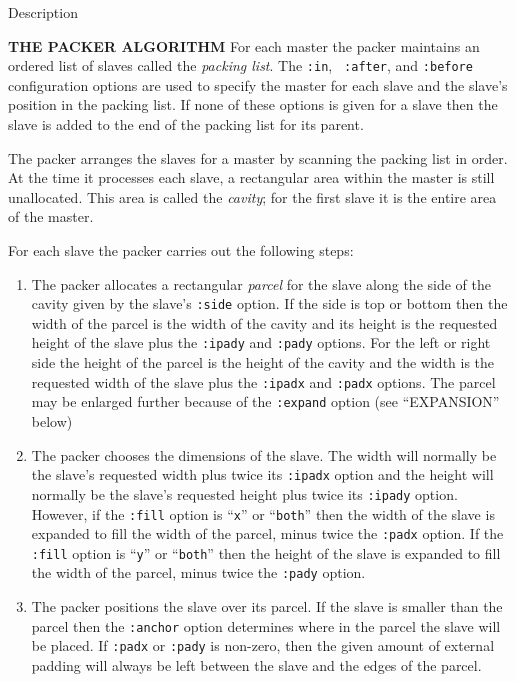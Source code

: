 \begin{schemedoc}{Description}

{\bf THE PACKER ALGORITHM} For each master the packer maintains an ordered
list of slaves called the {\em packing list}.  The {\tt :in}, {\tt
:after}, and {\tt :before} configuration options are used to specify the
master for each slave and the slave's position in the packing list.  If
none of these options is given for a slave then the slave is added to the
end of the packing list for its parent.

The packer arranges the slaves for a master by scanning the packing list in
order.  At the time it processes each slave, a rectangular area within the
master is still unallocated.  This area is called the {\em cavity}; for the
first slave it is the entire area of the master.

For each slave the packer carries out the following steps:

\begin{enumerate}
\item
The packer allocates a rectangular {\em parcel} for the slave
along the side of the cavity given by the slave's {\tt :side} option.
If the side is top or bottom then the width of the parcel is
the width of the cavity and its height is the requested height
of the slave plus the {\tt :ipady} and {\tt :pady} options.
For the left or right side the height of the parcel is
the height of the cavity and the width is the requested width
of the slave plus the {\tt :ipadx} and {\tt :padx} options.
The parcel may be enlarged further because of the {\tt :expand}
option (see ``EXPANSION'' below)

\item
The packer chooses the dimensions of the slave.
The width will normally be the slave's requested width plus
twice its {\tt :ipadx} option and the height will normally be
the slave's requested height plus twice its {\tt :ipady}
option.
However, if the {\tt :fill} option is ``{\tt x}'' or ``{\tt both}''
then the width of the slave is expanded to fill the width of the parcel,
minus twice the {\tt :padx} option.
If the {\tt :fill} option is ``{\tt y}'' or ``{\tt both}''
then the height of the slave is expanded to fill the width of the parcel,
minus twice the {\tt :pady} option.

\item
The packer positions the slave over its parcel.
If the slave is smaller than the parcel then the {\tt :anchor}
option determines where in the parcel the slave will be placed.
If {\tt :padx} or {\tt :pady} is non-zero, then the given
amount of external padding will always be left between the
slave and the edges of the parcel.
\end{enumerate}


\end{schemedoc}
